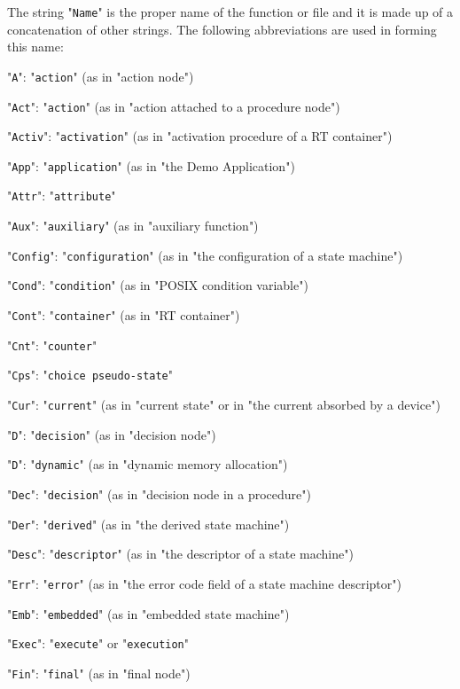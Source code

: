 \documentclass[a4paper,10pt]{article}
\newenvironment{fw_itemize}						%
{\begin{itemize}
  \setlength{\itemsep}{1mm}
  \setlength{\parskip}{0pt}
  \setlength{\parsep}{0pt}}
{\end{itemize}}
\begin{document}
The string "\texttt{Name}" is the proper name of the function or file and it is made up of a concatenation of other strings. The following abbreviations are used in forming this name:

\begin{fw_itemize}
\item "\texttt{A}": "\texttt{action}" (as in "action node")
\item "\texttt{Act}": "\texttt{action}" (as in "action attached to a procedure node")
\item "\texttt{Activ}": "\texttt{activation}" (as in "activation procedure of a RT container")
\item "\texttt{App}": "\texttt{application}" (as in "the Demo Application")
\item "\texttt{Attr}": "\texttt{attribute}"
\item "\texttt{Aux}": "\texttt{auxiliary}" (as in "auxiliary function")
\item "\texttt{Config}": "\texttt{configuration}" (as in "the configuration of a state machine")
\item "\texttt{Cond}": "\texttt{condition}" (as in "POSIX condition variable")
\item "\texttt{Cont}": "\texttt{container}" (as in "RT container")
\item "\texttt{Cnt}": "\texttt{counter}"
\item "\texttt{Cps}": "\texttt{choice pseudo-state}"
\item "\texttt{Cur}": "\texttt{current}" (as in "current state" or in "the current absorbed by a device")
\item "\texttt{D}": "\texttt{decision}" (as in "decision node")
\item "\texttt{D}": "\texttt{dynamic}" (as in "dynamic memory allocation")
\item "\texttt{Dec}": "\texttt{decision}" (as in "decision node in a procedure")
\item "\texttt{Der}": "\texttt{derived}" (as in "the derived state machine")
\item "\texttt{Desc}": "\texttt{descriptor}" (as in "the descriptor of a state machine")
\item "\texttt{Err}": "\texttt{error}" (as in "the error code field of a state machine descriptor")
\item "\texttt{Emb}": "\texttt{embedded}" (as in "embedded state machine")
\item "\texttt{Exec}": "\texttt{execute}" or "\texttt{execution}"
\item "\texttt{Fin}": "\texttt{final}" (as in "final node")

\end{fw_itemize}
\end{document}

